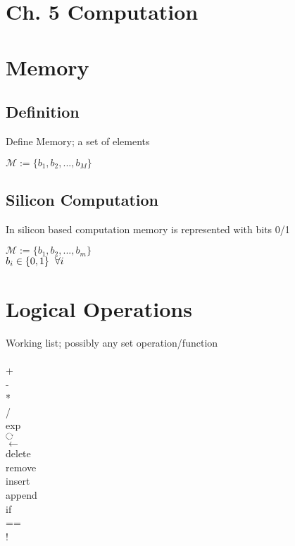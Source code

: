 \documentclass[11pt]{article}
\def \loop {\ensuremath{\rotatebox[origin=c]{-90}{$\circlearrowright$}}}
\begin{document}
\section*{Ch. 5 Computation}





\section{Memory}

\subsection{Definition}
Define Memory; a set of elements
\begin{center}
$\mathcal{M} := \{b_1,b_2,...,b_M\}$
\end{center}

\subsection{Silicon Computation}
In silicon based computation memory is represented with bits 0/1
\begin{center}
$\mathcal{M} := \{b_1,b_2,...,b_m\}$
\\ \vspace{2mm}
$b_i \in \{0,1\} \hspace{2mm} \forall i$
\end{center}

\section{Logical Operations}
Working list; possibly any set operation/function\\
\\
+\\
-\\
*\\
/\\
exp\\
\loop\\
$\leftarrow$\\
delete\\
remove\\
insert\\
append\\
if\\
==\\
!\\
\end{document}

